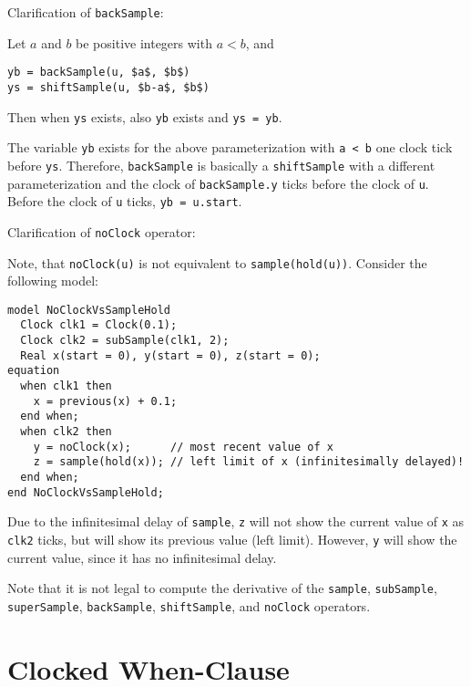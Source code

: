 \begin{nonnormative}
Clarification of \lstinline!backSample!:

Let $a$ and $b$ be positive integers with $a < b$, and
\begin{lstlisting}[language=modelica]
yb = backSample(u, $a$, $b$)
ys = shiftSample(u, $b-a$, $b$)
\end{lstlisting}

Then when \lstinline!ys! exists, also \lstinline!yb! exists and \lstinline!ys = yb!.

The variable \lstinline!yb! exists for the above parameterization with \lstinline!a < b! one clock tick before \lstinline!ys!.
Therefore, \lstinline!backSample! is basically a \lstinline!shiftSample! with a different parameterization and the clock of \lstinline!backSample.y! ticks before the clock of \lstinline!u!.
Before the clock of \lstinline!u! ticks, \lstinline!yb = u.start!.
\end{nonnormative}

\begin{nonnormative}
Clarification of \lstinline!noClock! operator:

Note, that \lstinline!noClock(u)! is not equivalent to \lstinline!sample(hold(u))!.  Consider the following model:
\begin{lstlisting}[language=modelica]
model NoClockVsSampleHold
  Clock clk1 = Clock(0.1);
  Clock clk2 = subSample(clk1, 2);
  Real x(start = 0), y(start = 0), z(start = 0);
equation
  when clk1 then
    x = previous(x) + 0.1;
  end when;
  when clk2 then
    y = noClock(x);      // most recent value of x
    z = sample(hold(x)); // left limit of x (infinitesimally delayed)!
  end when;
end NoClockVsSampleHold;
\end{lstlisting}

Due to the infinitesimal delay of \lstinline!sample!, \lstinline!z! will not show the current value of \lstinline!x! as \lstinline!clk2! ticks, but will show its previous value (left limit).  However, \lstinline!y! will show the current value, since it has no infinitesimal delay.
\end{nonnormative}

Note that it is not legal to compute the derivative of the \lstinline!sample!, \lstinline!subSample!, \lstinline!superSample!, \lstinline!backSample!,
\lstinline!shiftSample!, and \lstinline!noClock! operators.

\section{Clocked When-Clause}\label{clocked-when-clause}

